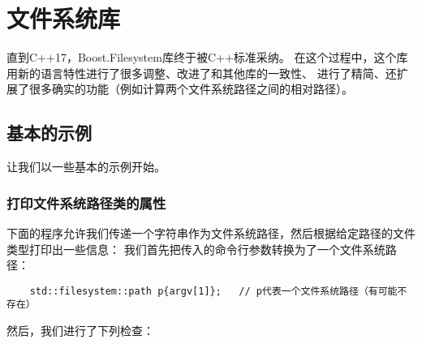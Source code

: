 \chapter{文件系统库}\label{ch20}
直到C++17，Boost.Filesystem库终于被C++标准采纳。
在这个过程中，这个库用新的语言特性进行了很多调整、改进了和其他库的一致性、
进行了精简、还扩展了很多确实的功能（例如计算两个文件系统路径之间的相对路径）。


\section{基本的示例}
让我们以一些基本的示例开始。

\subsection{打印文件系统路径类的属性}
下面的程序允许我们传递一个字符串作为文件系统路径，然后根据给定路径的文件类型打印出一些信息：
我们首先把传入的命令行参数转换为了一个文件系统路径：
\begin{lstlisting}
    std::filesystem::path p{argv[1]};   // p代表一个文件系统路径（有可能不存在）
\end{lstlisting}
然后，我们进行了下列检查：

